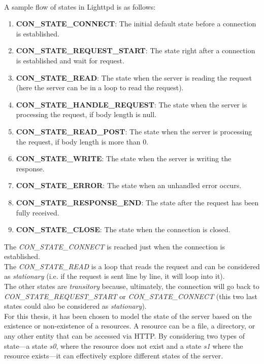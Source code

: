 \\A sample flow of states in Lighttpd is as follows:
\begin{enumerate}
    \item \textbf{CON\_STATE\_CONNECT}: The initial default state before a connection is established.
    
    \item \textbf{CON\_STATE\_REQUEST\_START}: The state right after a connection is established and wait for request.
    
    \item \textbf{CON\_STATE\_READ}: The state when the server is reading the request (here the server can be in a loop to read the request).
    
    \item \textbf{CON\_STATE\_HANDLE\_REQUEST}: The state when the server is processing the request, if body length is null.
    
    \item \textbf{CON\_STATE\_READ\_POST}: The state when the server is processing the request, if body length is more than 0.
    
    \item \textbf{CON\_STATE\_WRITE}: The state when the server is writing the response.
    \item \textbf{CON\_STATE\_ERROR}: The state when an unhandled error occurs.
    
    \item \textbf{CON\_STATE\_RESPONSE\_END}: The state after the request has been fully received.
    
    \item \textbf{CON\_STATE\_CLOSE}: The state when the connection is closed.
\end{enumerate}
The \textit{CON\_STATE\_CONNECT} is reached just when the connection is established.
\\The \textit{CON\_STATE\_READ} is a loop that reads the request and can be considered as \textit{stationary} (i.e. if the request is sent line by line, it will loop into it).
\\The other states are \textit{transitory} because, ultimately, the connection will go back to \textit{CON\_STATE\_REQUEST\_START} or \textit{CON\_STATE\_CONNECT} (this two last states could also be considered as \textit{stationary}).
\\For this thesis, it has been chosen to model the state of the server based on the existence or non-existence of a resources. A resource can be a file, a directory, or any other entity that can be accessed via HTTP. By considering two types of state—a state \textit{s0}, where the resource does not exist and a state \textit{s1} where the resource exists—it can effectively explore different states of the server.

